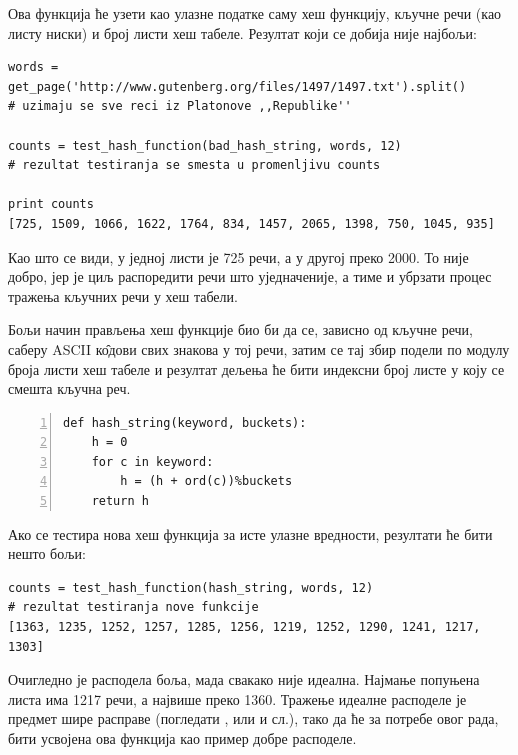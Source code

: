 Ова функција ће узети као улазне податке саму хеш функцију, кључне речи (као листу ниски) и број листи хеш табеле. Резултат који се добија није најбољи:

\begin{lstlisting}[caption = Резултат тестирања лоше hash функције, label={lst:resultstest}]
words = get_page('http://www.gutenberg.org/files/1497/1497.txt').split()
# uzimaju se sve reci iz Platonove ,,Republike''

counts = test_hash_function(bad_hash_string, words, 12)
# rezultat testiranja se smesta u promenljivu counts

print counts
[725, 1509, 1066, 1622, 1764, 834, 1457, 2065, 1398, 750, 1045, 935]
\end{lstlisting}

Као што се види, у једној листи је 725 речи, а у другој преко 2000. То није добро, јер је циљ распоредити речи што уједначеније, а тиме и убрзати процес тражења кључних речи у хеш табели.

Бољи начин прављења хеш функције био би да се, зависно од кључне речи, саберу ASCII к\^{о}дови свих знакова у тој речи, затим се тај збир подели по модулу броја листи хеш табеле и резултат дељења ће бити индексни број листе у коју се смешта кључна реч.

\begin{lstlisting}[caption=Боља хеш функција, label={lst:betterhash}, numbers = left]
def hash_string(keyword, buckets):
    h = 0
    for c in keyword:
        h = (h + ord(c))%buckets
    return h
\end{lstlisting}

Ако се тестира нова хеш функција за исте улазне вредности, резултати ће бити нешто бољи:

\begin{lstlisting}[caption = Тестирање боље хеш функције,label={lst:betterhashtest}]
counts = test_hash_function(hash_string, words, 12)
# rezultat testiranja nove funkcije
[1363, 1235, 1252, 1257, 1285, 1256, 1219, 1252, 1290, 1241, 1217, 1303]
\end{lstlisting}

Очигледно је расподела боља, мада свакако није идеална. Најмање попуњена листа има 1217 речи, а највише преко 1360. Тражење идеалне расподеле је предмет шире расправе (погледати \cite[поглавље~6.4]{Knuth1998ACP}, \cite[поглавље~3]{cormen2001introduction} или \cite{artofhashing} и сл.), тако да ће за потребе овог рада, бити усвојена ова функција као пример добре расподеле.

